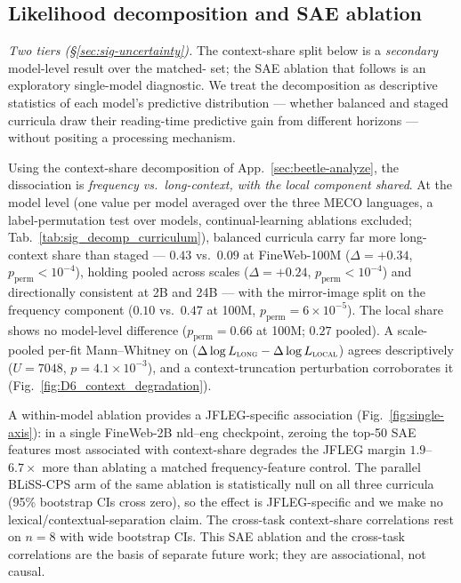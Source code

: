 \subsection{Likelihood decomposition and SAE ablation}\label{sec:meco-mech-app}
 
\emph{Two tiers (\S\ref{sec:sig-uncertainty}).} The context-share split below is a \emph{secondary} model-level result over the matched-\beetle{} set; the SAE ablation that follows is an exploratory single-model diagnostic. We treat the decomposition as descriptive statistics of each model's predictive distribution --- whether balanced and staged curricula draw their reading-time predictive gain from different horizons --- without positing a processing mechanism.
 
Using the context-share decomposition of App.~\ref{sec:beetle-analyze}, the dissociation is \emph{frequency vs.\ long-context, with the local component shared}. At the model level (one value per model averaged over the three MECO languages, a label-permutation test over models, continual-learning ablations excluded; Tab.~\ref{tab:sig_decomp_curriculum}), balanced curricula carry far more long-context share than staged --- $0.43$ vs.\ $0.09$ at FineWeb-100M ($\Delta{=}{+}0.34$, $p_\text{perm}{<}10^{-4}$), holding pooled across scales ($\Delta{=}{+}0.24$, $p_\text{perm}{<}10^{-4}$) and directionally consistent at 2B and 24B --- with the mirror-image split on the frequency component ($0.10$ vs.\ $0.47$ at 100M, $p_\text{perm}{=}6{\times}10^{-5}$). The local share shows no model-level difference ($p_\text{perm}{=}0.66$ at 100M; $0.27$ pooled). A scale-pooled per-fit Mann--Whitney on ($\Delta\log L_\textsc{long}-\Delta\log L_\textsc{local}$) agrees descriptively ($U{=}7048$, $p{=}4.1{\times}10^{-3}$), and a context-truncation perturbation corroborates it (Fig.~\ref{fig:D6_context_degradation}).
 
A within-model ablation provides a JFLEG-specific association (Fig.~\ref{fig:single-axis}): in a single FineWeb-2B nld--eng checkpoint, zeroing the top-50 SAE features most associated with context-share degrades the JFLEG margin $1.9$--$6.7\times$ more than ablating a matched frequency-feature control. The parallel BLiSS-CPS arm of the same ablation is statistically null on all three curricula (95\% bootstrap CIs cross zero), so the effect is JFLEG-specific and we make no lexical/contextual-separation claim. The cross-task context-share correlations rest on $n{=}8$ with wide bootstrap CIs. This SAE ablation and the cross-task correlations are the basis of separate future work; they are associational, not causal.
 
